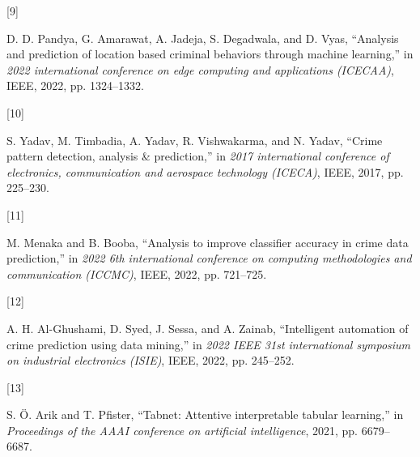 \documentclass[11 pt,conference,final,]{IEEEtran}
\newlength{\cslhangindent}
\newlength{\csllabelwidth}
\newenvironment{CSLReferences}[2] %
 {\begin{list}{}{%
  \setlength{\itemindent}{0pt}
  \setlength{\leftmargin}{0pt}
  \setlength{\parsep}{0pt}
  \ifodd #1
   \setlength{\leftmargin}{\cslhangindent}
   \setlength{\itemindent}{-1\cslhangindent}
  \fi
  \setlength{\itemsep}{#2\baselineskip}}}
 {\end{list}}
\newcommand{\CSLLeftMargin}[1]{\parbox[t]{\csllabelwidth}{#1}}
\newcommand{\CSLRightInline}[1]{\parbox[t]{\linewidth - \csllabelwidth}{#1}\break}
\begin{document}
\begin{CSLReferences}{0}{0}
\CSLLeftMargin{{[}9{]} }%
\CSLRightInline{D. D. Pandya, G. Amarawat, A. Jadeja, S. Degadwala, and
D. Vyas, {``Analysis and prediction of location based criminal behaviors
through machine learning,''} in \emph{2022 international conference on
edge computing and applications (ICECAA)}, IEEE, 2022, pp. 1324--1332.}

\CSLLeftMargin{{[}10{]} }%
\CSLRightInline{S. Yadav, M. Timbadia, A. Yadav, R. Vishwakarma, and N.
Yadav, {``Crime pattern detection, analysis \& prediction,''} in
\emph{2017 international conference of electronics, communication and
aerospace technology (ICECA)}, IEEE, 2017, pp. 225--230.}

\CSLLeftMargin{{[}11{]} }%
\CSLRightInline{M. Menaka and B. Booba, {``Analysis to improve
classifier accuracy in crime data prediction,''} in \emph{2022 6th
international conference on computing methodologies and communication
(ICCMC)}, IEEE, 2022, pp. 721--725.}

\CSLLeftMargin{{[}12{]} }%
\CSLRightInline{A. H. Al-Ghushami, D. Syed, J. Sessa, and A. Zainab,
{``Intelligent automation of crime prediction using data mining,''} in
\emph{2022 IEEE 31st international symposium on industrial electronics
(ISIE)}, IEEE, 2022, pp. 245--252.}

\CSLLeftMargin{{[}13{]} }%
\CSLRightInline{S. Ö. Arik and T. Pfister, {``Tabnet: Attentive
interpretable tabular learning,''} in \emph{Proceedings of the AAAI
conference on artificial intelligence}, 2021, pp. 6679--6687.}

\end{CSLReferences}
\end{document}
